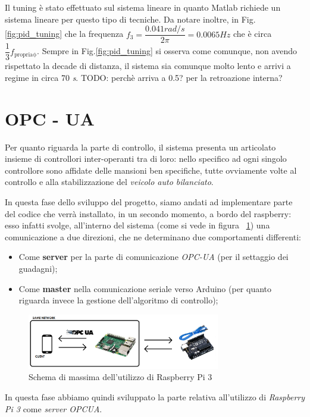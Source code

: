 Il tuning è stato effettuato sul sistema lineare in quanto Matlab richiede un sistema lineare per questo tipo di tecniche. Da notare inoltre, in Fig.\ref{fig:pid_tuning} che la frequenza $f_3 = \dfrac{0.041 \textit{rad/s}}{2\pi} = 0.0065 Hz$ che è circa $\dfrac{1}{3} 	f_{\mathrm{propria\phi}}$.
Sempre in Fig.\ref{fig:pid_tuning} si osserva come comunque, non avendo rispettato la decade di distanza, il sistema sia comunque molto lento e arrivi a regime in circa 70 \textit{s}.
TODO: perchè arriva a 0.5? per la retroazione interna?
\section{OPC - UA}
Per quanto riguarda la parte di controllo, il sistema presenta un articolato insieme di controllori inter-operanti tra di loro: nello specifico ad ogni singolo controllore sono affidate delle mansioni ben specifiche, tutte ovviamente volte al controllo e alla stabilizzazione del \textit{veicolo auto bilanciato}.

In questa fase dello sviluppo del progetto, siamo andati ad implementare parte del codice che verrà installato, in un secondo momento, a bordo del raspberry: esso infatti svolge, all'interno del sistema (come si vede in figura ~\ref{fig:OPCUA_schema}) una comunicazione a due direzioni, che ne determinano due comportamenti differenti:
\begin{itemize}
	\item Come \textbf{server} per la parte di comunicazione \textit{OPC-UA} (per il settaggio dei guadagni);
	\item Come \textbf{master} nella comunicazione seriale verso Arduino (per quanto riguarda invece la gestione dell'algoritmo di controllo);
\end{itemize}

 \begin{figure}[H]
	\centering   	
	\includegraphics[width=0.75\textwidth]{Immagini/OPCUA_schema.png}
	\caption{Schema di massima dell'utilizzo di Raspberry Pi 3}
	\label{fig:OPCUA_schema}
\end{figure}

In questa fase abbiamo quindi sviluppato la parte relativa all'utilizzo di \textit{Raspberry Pi 3} come \textit{server OPCUA}.

